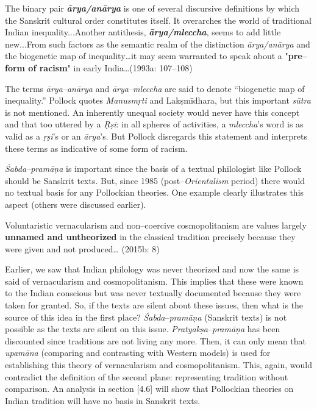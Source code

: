 \begin{myquote}
The binary pair \textit{\textbf{ārya/anārya}} is one of several discursive definitions by which the Sanskrit cultural order constitutes itself. It overarches the world of traditional Indian inequality...Another antithesis, \textit{\textbf{ā}\textbf{rya/mleccha}}, seems to add little new...From such factors as the semantic realm of the distinction \textit{ārya/anārya} and the biogenetic map of inequality…it may seem warranted to speak about a "\textbf{pre–form of racism}" in early India…\break (1993a: 107–108)
\end{myquote}

The terms \textit{ārya–anārya} and \textit{ārya–mleccha} are said to denote “biogenetic map of inequality.” Pollock quotes \textit{Manusmṛti} and Lakṣmīdhara, but this important \textit{sūtra }is not mentioned. An inherently unequal society would never have this concept and that too uttered by a \textit{Ṛṣi}: in all spheres of activities, a \textit{mleccha}’s word is as valid as a \textit{ṛṣi}’s or an\textit{ ārya}’s. But Pollock disregards this statement and interprets these terms as indicative of some form of racism.


\textit{Śabda–pramāṇa} is important since the basis of a textual philologist like Pollock should be Sanskrit texts. But, since 1985 (post–\textit{Orientalism} period) there would no textual basis for any Pollockian theories. One example clearly illustrates this aspect (others were discussed earlier).

\begin{myquote}
Voluntaristic vernacularism and non–coercive cosmopolitanism are values largely \textbf{unnamed and untheorized} in the classical tradition precisely because they were given and not produced… (2015b: 8)
\end{myquote}

Earlier, we saw that Indian philology was never theorized and now the same is said of vernacularism and cosmopolitanism. This implies that these were known to the Indian conscious but was never textually documented because they were taken for granted. So, if the texts are silent about these issues, then what is the source of this idea in the first place? \textit{Śabda}–\textit{pramāṇa} (Sanskrit texts) is not possible as the texts are silent on this issue. \textit{Pratyakṣa}–\textit{pramāṇa} has been discounted since traditions are not living any more. Then, it can only mean that \textit{upamāna} (comparing and contrasting with Western models) is used for establishing this theory of vernacularism and cosmopolitanism. This, again, would contradict the definition of the second plane: representing tradition without comparison. An analysis in section [4.6] will show that Pollockian theories on Indian tradition will have no basis in Sanskrit texts.

